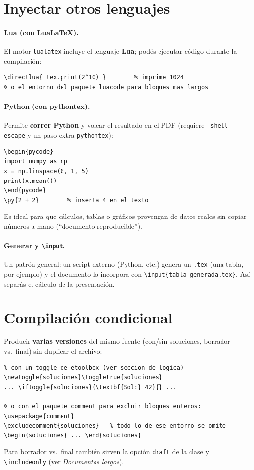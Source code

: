 \documentclass[11pt,a4paper]{article}
\newcommand{\C}[1]{\texttt{\textbackslash #1}}
\newcommand{\pkg}[1]{\textsf{#1}}
\newcounter{ejemplo}                        %
\begin{document}
\section{Inyectar otros lenguajes}
\paragraph{Lua (con LuaLaTeX).} El motor \texttt{lualatex} incluye el lenguaje
\textbf{Lua}; podés ejecutar código durante la compilación:
\begin{lstlisting}
\directlua{ tex.print(2^10) }        % imprime 1024
% o el entorno del paquete luacode para bloques mas largos
\end{lstlisting}

\paragraph{Python (con \pkg{pythontex}).} Permite \textbf{correr Python} y volcar
el resultado en el PDF (requiere \texttt{-shell-escape} y un paso extra
\texttt{pythontex}):
\begin{lstlisting}
\begin{pycode}
import numpy as np
x = np.linspace(0, 1, 5)
print(x.mean())
\end{pycode}
\py{2 + 2}        % inserta 4 en el texto
\end{lstlisting}
Es ideal para que cálculos, tablas o gráficos provengan de datos reales sin
copiar números a mano (\enquote{documento reproducible}).

\paragraph{Generar y \texttt{\textbackslash input}.} Un patrón general: un script
externo (Python, etc.) genera un \texttt{.tex} (una tabla, por ejemplo) y el
documento lo incorpora con \C{input\{tabla\_generada.tex\}}. Así separás el
cálculo de la presentación.

\section{Compilación condicional}
Producir \textbf{varias versiones} del mismo fuente (con/sin soluciones, borrador
vs.\ final) sin duplicar el archivo:
\begin{lstlisting}
% con un toggle de etoolbox (ver seccion de logica)
\newtoggle{soluciones}\toggletrue{soluciones}
... \iftoggle{soluciones}{\textbf{Sol:} 42}{} ...

% o con el paquete comment para excluir bloques enteros:
\usepackage{comment}
\excludecomment{soluciones}   % todo lo de ese entorno se omite
\begin{soluciones} ... \end{soluciones}
\end{lstlisting}
Para borrador vs.\ final también sirven la opción \texttt{draft} de la clase y
\C{includeonly} (ver \emph{Documentos largos}).
\end{document}
